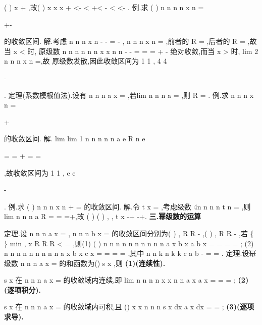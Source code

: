 (
)
x +
,故(
)
x
x
x
+
<\Rightarrow -
<
+<
\Rightarrow -
<
<-
. 
\textcolor{lyred}{例}.求
(
)
n
n
n
n
x
n
\infty 
=


+-


\sum 
的收敛区间. 
解.考虑
n
n
n
x
n
-
\infty 
-
=
-
\sum 
,
n
n
n
x
n
\infty 
=\sum 
,前者的
R =
,后者的
R =
,故当
x <
时, 
原级数
n
n
n
n
n
n
x
x
n
n
-
\infty 
\infty 
-
=
=
=
+
-
\sum 
\sum 
绝对收敛,而当
x >
时,
lim 2
n
n
n
x
n
\to \infty 
=\infty ,故 
原级数发散,因此收敛区间为
1 1
,
4 4


-




. 
\textcolor{lyred}{定理(系数模根值法)}.设有
n
n
n
a x
\infty 
=\sum 
,若lim n
n
n
a
\rho 
\to \infty 
=
,则
R
\rho 
=
. 
\textcolor{lyred}{例}.求
n
n
n
x
n
\infty 
=


+




\sum 
的收敛区间. 
解.
lim
lim 1
n
n
n
n
n
a
e
R
n
e
\rho 
\to \infty 
\to \infty 


=
=
+
=
\Rightarrow 
=




,故收敛区间为
1 1
,
e e


-




. 
\textcolor{lyred}{例}.求
(
)
n
n
n
x
n
\infty 
+
=\sum 
的收敛区间. 
解.令
t
x
=
,考虑级数
4n
n
n
n
t
n
\infty 
=\sum 
,则
lim
n
n
n
a
R
\rho 
\to \infty 
=
=
\Rightarrow 
=+\infty ,故 
(
)
(
)
,
,
t
x
\in -\infty +\infty \Rightarrow 
\in -\infty +\infty . 
\vspace{4pt}
{\bfseries \textcolor{lyred}{三.幂级数的运算}}

\textcolor{lyred}{定理}.设
n
n
n
a x
\infty 
=\sum 
,
n
n
n
b x
\infty 
=\sum 
的收敛区间分别为(
)
,
R R
-
,(
)
,
R R
-
,若 
\{
\}
min
,
x
R
R R
<
=
,则(1)
(
)
n
n
n
n
n
n
n
n
n
n
a x
b x
a
b
x
\infty 
\infty 
\infty 
=
=
=
\pm 
=
\pm 
\sum 
\sum 
\sum 
; 
(2)
n
n
n
n
n
n
n
n
n
a x
b x
c x
\infty 
\infty 
\infty 
=
=
=
\cdots 
=
\sum 
\sum 
\sum 
,其中
n
n
k
n k
k
c
a b -
=
=\sum 
. 
\textcolor{lyred}{定理}.设幂级数
n
n
n
a x
\infty 
=\sum 
的和函数为()
s x ,则\textcolor{lyred}{ }
{\bfseries \textcolor{lyred}{(1)(连续性). }}

s x 在
n
n
n
a x
\infty 
=\sum 
的收敛域内连续,即
lim
n
n
n
n
x
x
n
n
a x
a x
\infty 
\infty 
\to 
=
=
=
\sum 
\sum 
; 
{\bfseries \textcolor{lyred}{(2)(逐项积分). }}

s x 在
n
n
n
a x
\infty 
=\sum 
的收敛域内可积,且
()
x
x
n
n
n
s x dx
a x dx
\infty 
=
=\sum 
\int 
\int 
; 
{\bfseries \textcolor{lyred}{(3)(逐项求导). }}

